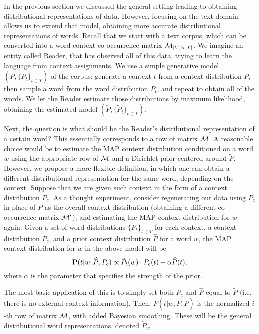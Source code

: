 In the previous section we discussed the general setting leading to
obtaining distributional representations of data. However, focusing on
the text domain allows us to extend that model, obtaining more
accurate distributional representations of words. Recall that we start
with a text corpus, which can be converted into a word-context
co-occurrence matrix ${\mathcal M}_{|V|\times|T|}$. 
We imagine an entity
called Reader, that has observed all of this data, trying to learn the
language from context assignments.
We use a simple generative model $(P,\{P_t\}_{t\in T})$ of the corpus: 
generate a context $t$ from a context distribution $P$, then sample a
word from the word distribution $P_t$,
and repeat to obtain all of the words. We let the Reader estimate
those distributions by maximum likelihood, obtaining the estimated
model $(\tilde{P},\{\tilde{P}_t\}_{t\in T})$.

Next, the question is what should be  
the Reader's distributional representation of a certain word? This
essentially corresponds to a row of matrix ${\mathcal M}$. A reasonable choice
would be to estimate the MAP context distribution conditioned on a word
$w$ using the appropriate row of ${\mathcal M}$ and a Dirichlet prior centered
around $\tilde{P}$. However, we propose
a more flexible definition, in which one can obtain a different
distributional representation for the same word, depending on the
context. Suppose that we are given such context in the form of a context
distribution $P_c$. As a thought experiment, consider regenerating our
data using $P_c$ in place of $P$ as the overall context
distribution (obtaining a different co-occurrence matrix ${\mathcal M}'$), and
estimating the MAP context distribution for $w$ again.
\bep\label{map}
Given a set of word distributions $\{\tilde{P}_t\}_{t\in T}$ for each
context, a context
distribution $P_c$, and a prior context distribution $\widehat{P}$ for a word $w$,
the MAP context distribution for $w$ in the above model will be
\[\operatorname{\mathbf{P}}(t|w,\widehat{P},P_c) \propto \tilde{P}_t(w)\cdot P_c(t) + \alpha
\widehat{P}(t),\]
where $\alpha$ is the parameter that specifies the strength of the prior.
\eep

The most basic application of this is to simply set
both $P_c$ and $\widehat{P}$ equal to $\tilde{P}$ (i.e. there is no external context
information). Then, $P(t|w,\tilde{P},\tilde{P})$ is the
normalized $i$-th row of matrix ${\mathcal M}$, with added Bayesian
smoothing. These will be the general distributional word
representations, denoted $\tilde{P}_w$. 

